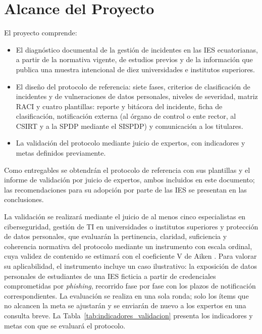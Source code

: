 \section{Alcance del Proyecto}
El proyecto comprende:
\begin{itemize}
  \item El diagnóstico documental de la gestión de incidentes en las IES ecuatorianas, a partir de la normativa vigente, de estudios previos y de la información que publica una muestra intencional de diez universidades e institutos superiores.
  \item El diseño del protocolo de referencia: siete fases, criterios de clasificación de incidentes y de vulneraciones de datos personales, niveles de severidad, matriz RACI y cuatro plantillas: reporte y bitácora del incidente, ficha de clasificación, notificación externa (al órgano de control o ente rector, al CSIRT y a la SPDP mediante el SISPDP) y comunicación a los titulares.
  \item La validación del protocolo mediante juicio de expertos, con indicadores y metas definidos previamente.
\end{itemize}

Como entregables se obtendrán el protocolo de referencia con sus plantillas y el informe de validación por juicio de expertos, ambos incluidos en este documento; las recomendaciones para su adopción por parte de las IES se presentan en las conclusiones.

La validación se realizará mediante el juicio de al menos cinco especialistas en ciberseguridad, gestión de TI en universidades o institutos superiores y protección de datos personales, que evaluarán la pertinencia, claridad, suficiencia y coherencia normativa del protocolo mediante un instrumento con escala ordinal, cuya validez de contenido se estimará con el coeficiente V de Aiken \cite{aiken1985}. Para valorar su aplicabilidad, el instrumento incluye un caso ilustrativo: la exposición de datos personales de estudiantes de una IES ficticia a partir de credenciales comprometidas por \textit{phishing}, recorrido fase por fase con los plazos de notificación correspondientes. La evaluación se realiza en una sola ronda; solo los ítems que no alcancen la meta se ajustarán y se enviarán de nuevo a los expertos en una consulta breve. La Tabla~\ref{tab:indicadores_validacion} presenta los indicadores y metas con que se evaluará el protocolo.

